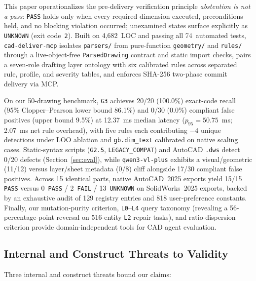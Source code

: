 \documentclass[nocopyright,nolists,upint,varvw,hyphenate]{asmejour}
\begin{document}
This paper operationalizes the pre-delivery verification principle \emph{abstention is not a pass}: \texttt{PASS} holds only when every required dimension executed, preconditions held, and no blocking violation occurred; unexamined states surface explicitly as \texttt{UNKNOWN} (exit code~\texttt{2}). Built on 4,682~LOC and passing all 74~automated tests, \texttt{cad-deliver-mcp} isolates \texttt{parsers/} from pure-function \texttt{geometry/} and \texttt{rules/} through a live-object-free \texttt{ParsedDrawing} contract and static import checks, pairs a seven-role drafting layer ontology with six calibrated rules across separated rule, profile, and severity tables, and enforces SHA-256 two-phase commit delivery via MCP.

On our 50-drawing benchmark, \texttt{G3} achieves 20/20 (100.0\%) exact-code recall (95\% Clopper--Pearson lower bound 86.1\%) and 0/30 (0.0\%) compliant false positives (upper bound 9.5\%) at 12.37~ms median latency ($p_{95}=50.75$~ms; 2.07~ms net rule overhead), with five rules each contributing $-4$ unique detections under LOO ablation and \texttt{gb.dim\_text} calibrated on native scaling cases. Static-syntax scripts (\texttt{G2.5}, \texttt{LEGACY\_COMPAT}) and AutoCAD \texttt{.dws} detect 0/20 defects (Section~\ref{sec:eval}), while \texttt{qwen3-vl-plus} exhibits a visual/geometric (11/12) versus layer/sheet metadata (0/8) cliff alongside 17/30 compliant false positives. Across 15 identical parts, native AutoCAD~2025 exports yield 15/15 \texttt{PASS} versus 0~\texttt{PASS} / 2~\texttt{FAIL} / 13~\texttt{UNKNOWN} on SolidWorks~2025 exports, backed by an exhaustive audit of 129 registry entries and 818 user-preference constants. Finally, our mutation-purity criterion, \texttt{L0}--\texttt{L4} query taxonomy (revealing a 56-percentage-point reversal on 516-entity \texttt{L2} repair tasks), and ratio-dispersion criterion provide domain-independent tools for CAD agent evaluation.

\subsection{Internal and Construct Threats to Validity}\label{sec:internal_threats}

Three internal and construct threats bound our claims:
\end{document}
